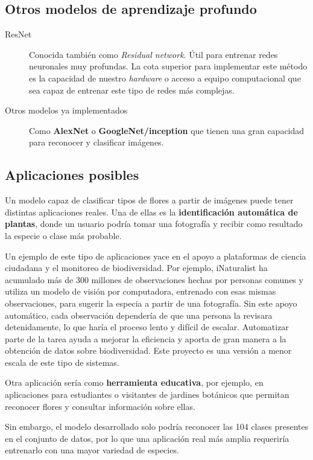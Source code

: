 \subsection{Otros modelos de aprendizaje profundo}

\begin{description}
    \item[ResNet] Conocida también como \textit{Residual network}. Útil para entrenar redes neuronales muy profundas. La cota superior para implementar este método es la capacidad de nuestro \textit{hardware} o acceso a equipo computacional que sea capaz de entrenar este tipo de redes más complejas.
    \item[Otros modelos ya implementados] Como \textbf{AlexNet} o \textbf{GoogleNet/inception} que tienen una gran capacidad para reconocer y clasificar imágenes.\autocite{ibmWhatImage}
\end{description}


\subsection{Aplicaciones posibles}

Un modelo capaz de clasificar tipos de flores a partir de imágenes puede tener distintas aplicaciones reales. Una de ellas es la \textbf{identificación automática de plantas}, donde un usuario podría tomar una fotografía y recibir como resultado la especie o clase más probable.


Un ejemplo de este tipo de aplicaciones yace en el apoyo a plataformas de ciencia ciudadana y el monitoreo de biodiversidad. Por ejemplo, iNaturalist ha acumulado más de 300 millones de observaciones hechas por personas comunes \autocite{inaturalist} y utiliza un modelo de visión por computadora, entrenado con esas mismas observaciones, para sugerir la especia a partir de una fotografía. Sin este apoyo automático, cada observación dependería de que una persona la revisara detenidamente, lo que haría el proceso lento y difícil de escalar. Automatizar parte de la tarea ayuda a mejorar la eficiencia y aporta de gran manera a la obtención de datos sobre biodiversidad. Este proyecto es una versión a menor escala de este tipo de sistemas. 

Otra aplicación sería como \textbf{herramienta educativa}, por ejemplo, en aplicaciones para estudiantes o visitantes de jardines botánicos que permitan reconocer flores y consultar información sobre ellas.

Sin embargo, el modelo desarrollado solo podría reconocer las 104 clases presentes en el conjunto de datos, por lo que una aplicación real más amplia requeriría entrenarlo con una mayor variedad de especies.
